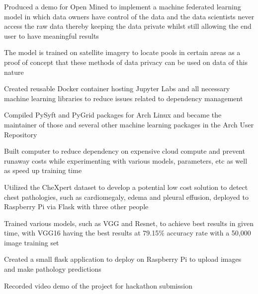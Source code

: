 \documentclass[letterpaper]{resume}
\begin{document}
\begin{compactitem}
\item Produced a demo for Open Mined to implement a machine federated learning model in which data owners have control of the data and the data scientists never access the raw data thereby keeping the data private whilst still allowing the end user to have meaningful results
\item The model is trained on satellite imagery to locate pools in certain areas as a proof of concept that these methods of data privacy can be used on data of this nature
\item Created reusable Docker container hosting Jupyter Labs and all necessary machine learning libraries to reduce issues related to dependency management
\item Compiled PySyft and PyGrid packages for Arch Linux and became the maintainer of those and several other machine learning packages in the Arch User Repository
\item Built computer to reduce dependency on expensive cloud compute and prevent runaway costs while experimenting with various models, parameters, etc as well as speed up training time
\end{compactitem}

\begin{compactitem}
\item Utilized the CheXpert dataset to develop a potential low cost solution to detect chest pathologies, such as cardiomegaly, edema and pleural effusion, deployed to Raspberry Pi via Flask with three other people
\item Trained various models, such as VGG and Resnet, to achieve best results in given time, with VGG16 having the best results at 79.15\% accuracy rate with a 50,000 image training set
\item Created a small flask application to deploy on Raspberry Pi to upload images and make pathology predictions
\item Recorded video demo of the project for hackathon submission
\end{compactitem}
\end{document}

